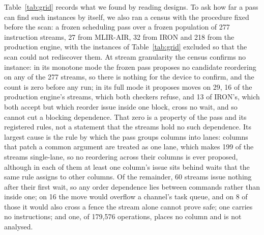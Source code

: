 Table~\ref{tab:grid} records what we found by reading designs. To ask how far a pass can find such instances by itself, we also ran a census with the procedure fixed before the scan: a frozen scheduling pass over a frozen population of 277 instruction streams, 27 from MLIR-AIR, 32 from IRON and 218 from the production engine, with the instances of Table~\ref{tab:grid} excluded so that the scan could not rediscover them.
At stream granularity the census confirms no instance: in its monotone mode the frozen pass proposes no candidate reordering on any of the 277 streams, so there is nothing for the device to confirm, and the count is zero before any run; in its full mode it proposes moves on 29, 16 of the production engine's streams, which both checkers refuse, and 13 of IRON's, which both accept but which reorder issue inside one block, cross no wait, and so cannot cut a blocking dependence.
That zero is a property of the pass and its registered rules, not a statement that the streams hold no such dependence.
Its largest cause is the rule by which the pass groups columns into lanes: columns that patch a common argument are treated as one lane, which makes 199 of the streams single-lane, so no reordering across their columns is ever proposed, although in each of them at least one column's issue sits behind waits that the same rule assigns to other columns.
Of the remainder, 60 streams issue nothing after their first wait, so any order dependence lies between commands rather than inside one; on 16 the move would overflow a channel's task queue, and on 8 of those it would also cross a fence the stream alone cannot prove safe; one carries no instructions; and one, of 179{,}576 operations, places no column and is not analysed.
